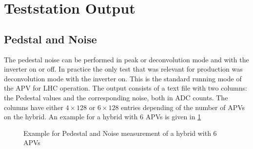 \section{Teststation Output}

\subsection{Pedstal and Noise}
The pedestal noise can be performed in peak or deconvolution mode and with the inverter on or off.
In practice the only test that was relevant for production was deconvolution mode with the inverter on.
This is the standard running mode of the APV for LHC operation.
The output consists of a text file with two columns: the Pedestal values and the corresponding noise, both in ADC counts.
The columns have either $4 \times 128$ or $6 \times 128$ entries depending of the number of APVs on the hybrid.
An example for a hybrid with 6 APVs is given in \ref{fig:ped_noise_example}
\begin{figure}[h]
  \begin{center}
    \caption{Example for Pedestal and Noise measurement of a hybrid with 6 APVs}
    \label{fig:ped_noise_example}
  \end{center}
\end{figure}



